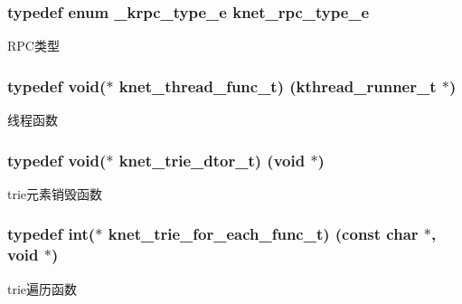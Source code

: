 \subsubsection[{knet\+\_\+rpc\+\_\+type\+\_\+e}]{\setlength{\rightskip}{0pt plus 5cm}typedef enum {\bf \+\_\+krpc\+\_\+type\+\_\+e}  {\bf knet\+\_\+rpc\+\_\+type\+\_\+e}}\label{a00066_a6fe1ebc0ddea56dd3c337115c1e10bc4_a6fe1ebc0ddea56dd3c337115c1e10bc4}
R\+P\+C类型 \hypertarget{a00066_a8741dac4a9f8d97603eb3a30a3473b13_a8741dac4a9f8d97603eb3a30a3473b13}{}
\subsubsection[{knet\+\_\+thread\+\_\+func\+\_\+t}]{\setlength{\rightskip}{0pt plus 5cm}typedef void($\ast$ knet\+\_\+thread\+\_\+func\+\_\+t) ({\bf kthread\+\_\+runner\+\_\+t} $\ast$)}\label{a00066_a8741dac4a9f8d97603eb3a30a3473b13_a8741dac4a9f8d97603eb3a30a3473b13}
线程函数 \hypertarget{a00066_a46741b0dab7bbb26d611c429ee64d78c_a46741b0dab7bbb26d611c429ee64d78c}{}
\subsubsection[{knet\+\_\+trie\+\_\+dtor\+\_\+t}]{\setlength{\rightskip}{0pt plus 5cm}typedef void($\ast$ knet\+\_\+trie\+\_\+dtor\+\_\+t) (void $\ast$)}\label{a00066_a46741b0dab7bbb26d611c429ee64d78c_a46741b0dab7bbb26d611c429ee64d78c}
trie元素销毁函数 \hypertarget{a00066_ad77af676ce15810f8f713bb3eaa91fe8_ad77af676ce15810f8f713bb3eaa91fe8}{}
\subsubsection[{knet\+\_\+trie\+\_\+for\+\_\+each\+\_\+func\+\_\+t}]{\setlength{\rightskip}{0pt plus 5cm}typedef int($\ast$ knet\+\_\+trie\+\_\+for\+\_\+each\+\_\+func\+\_\+t) (const char $\ast$, void $\ast$)}\label{a00066_ad77af676ce15810f8f713bb3eaa91fe8_ad77af676ce15810f8f713bb3eaa91fe8}
trie遍历函数 \hypertarget{a00066_af1cfaee0eb1c76ebf06076b95cc47ee1_af1cfaee0eb1c76ebf06076b95cc47ee1}{}
